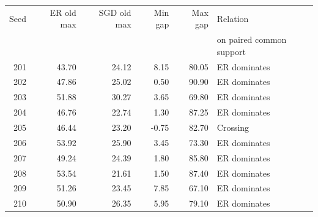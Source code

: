 \begin{tabular}{rrrrrl}
\toprule
Seed & ER old max & SGD old max & Min gap & Max gap & Relation \\
 & & & & & on paired common support \\
\midrule
201 & 43.70 & 24.12 & 8.15 & 80.05 & ER dominates \\
202 & 47.86 & 25.02 & 0.50 & 90.90 & ER dominates \\
203 & 51.88 & 30.27 & 3.65 & 69.80 & ER dominates \\
204 & 46.76 & 22.74 & 1.30 & 87.25 & ER dominates \\
205 & 46.44 & 23.20 & -0.75 & 82.70 & Crossing \\
206 & 53.92 & 25.90 & 3.45 & 73.30 & ER dominates \\
207 & 49.24 & 24.39 & 1.80 & 85.80 & ER dominates \\
208 & 53.54 & 21.61 & 1.50 & 87.40 & ER dominates \\
209 & 51.26 & 23.45 & 7.85 & 67.10 & ER dominates \\
210 & 50.90 & 26.35 & 5.95 & 79.10 & ER dominates \\
\bottomrule
\end{tabular}
